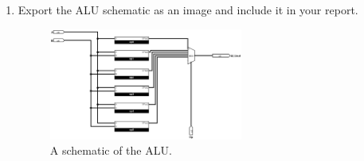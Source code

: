 \documentclass{article}
\begin{document}
\begin{enumerate}
\item Export the ALU schematic as an image and include it in your report.

\begin{figure}[ht!]
    \centering
    \includegraphics[width=0.6\textwidth]{lab3_alu.png}
    \caption{A schematic of the ALU.}
    \label{f:alu}
\end{figure}
\end{enumerate}
\end{document}
